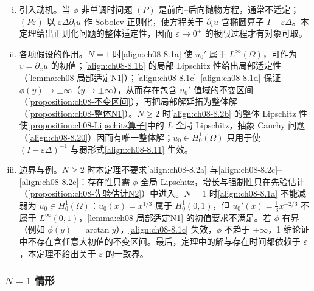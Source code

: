 \documentclass[../../main.tex]{subfiles}%
\begin{document}
\begin{remark}\label{remark:ch08-适定动机}
\begin{enumerate}[(i)]
\item 引入动机。当 $\phi$ 非单调时问题 $(P)$ 是前向--后向抛物方程，通常不适定；$(P\varepsilon)$ 以 $\varepsilon\Delta\partial_tu$ 作 Sobolev 正则化，使方程关于 $\partial_tu$ 含椭圆算子 $I-\varepsilon\Delta$。本定理给出正则化问题的整体适定性，因而 $\varepsilon\to0^+$ 的极限过程才有对象可取。
\item 各项假设的作用。$N=1$ 时\eqref{align:ch08-8.1a} 使 $u_0'$ 属于 $L^\infty(\Omega)$，可作为 $v=\partial_xu$ 的初值；\eqref{align:ch08-8.1b} 的局部 Lipschitz 性给出局部适定性（\cref{lemma:ch08-局部适定N1}）；\eqref{align:ch08-8.1c}--\eqref{align:ch08-8.1d} 保证 $\phi(y)\to\pm\infty$（$y\to\pm\infty$），从而存在包含 $u_0'$ 值域的不变区间（\cref{proposition:ch08-不变区间}），再把局部解延拓为整体解（\cref{proposition:ch08-整体N1}）。$N\geqslant2$ 时\eqref{align:ch08-8.2b} 的整体 Lipschitz 性使\cref{proposition:ch08-Lipschitz算子}中的 $L$ 全局 Lipschitz，抽象 Cauchy 问题（\eqref{align:ch08-8.20}）因而有唯一整体解；$u_0\in H^1_0(\Omega)$ 只用于使 $(I-\varepsilon\Delta)^{-1}$ 与弱形式\eqref{align:ch08-8.11} 生效。
\item 边界与例。$N\geqslant2$ 时本定理不要求\eqref{align:ch08-8.2a} 与\eqref{align:ch08-8.2c}--\eqref{align:ch08-8.2e}：存在性只需 $\phi$ 全局 Lipschitz，增长与强制性只在先验估计（\cref{proposition:ch08-先验估计N2}）中进入。$N=1$ 时\eqref{align:ch08-8.1a} 不能减弱为 $u_0\in H^1_0(\Omega)$：$u_0(x)=x^{1/3}$ 属于 $H^1_0(0,1)$，但 $u_0'(x)=\frac13x^{-2/3}$ 不属于 $L^\infty(0,1)$，\cref{lemma:ch08-局部适定N1} 的初值要求不满足。若 $\phi$ 有界（例如 $\phi(y)=\arctan y$），\eqref{align:ch08-8.1c} 失效，$\phi$ 不趋于 $\pm\infty$，1 维论证中不存在含任意大初值的不变区间。最后，定理中的解与存在时间都依赖于 $\varepsilon$，本定理不给出关于 $\varepsilon$ 的一致界。
\end{enumerate}
\end{remark}

\subsubsection{$N=1$ 情形}\label{subsubsection:ch08-N1存在}
\end{document}
